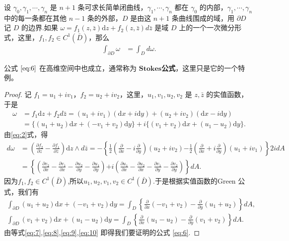 \documentclass[../../main.tex]{subfiles}
\begin{document}
\begin{theorem}[Green公式]\label{theorem:Green公式-复变函数形式}
设 \( \gamma_0, \gamma_1, \cdots, \gamma_n \) 是 \( n + 1 \) 条可求长简单闭曲线，\( \gamma_1, \cdots, \gamma_n \) 都在 \( \gamma_0 \) 的内部，\( \gamma_1, \cdots, \gamma_n \) 中的每一条都在其他 \( n - 1 \) 条的外部，\( D \) 是由这 \( n + 1 \) 条曲线围成的域，用 \(\partial D \) 记 \( D \) 的边界.如果 \( \omega = f_1(z,\bar{z})\mathrm{d}z + f_2(z,\bar{z})d\bar{z} \) 是域 \( D \) 上的一个一次微分形式，这里，\( f_1,f_2 \in C^1(\bar{D}) \)，那么
\begin{align}
\int_{\partial D} \omega &= \int_D d\omega. \label{eq:6}
\end{align}
\end{theorem}
\begin{note}
公式 \(\eqref{eq:6}\) 在高维空间中也成立，通常称为 $\mathbf{Stokes}$\textbf{公式}，这里只是它的一个特例。
\end{note}
\begin{proof}
记 \( f_1 = u_1 + iv_1 \)，\( f_2 = u_2 + iv_2 \)，这里，\( u_1,v_1,u_2,v_2 \) 是 \( z,\bar{z} \) 的实值函数，于是
\begin{align}\label{eq:7}
\omega &= f_1 \mathrm{d}z + f_2 d\bar{z} = (u_1 + iv_1)(\mathrm{d}x + i\mathrm{d}y) + (u_2 + iv_2)(\mathrm{d}x - i\mathrm{d}y) \nonumber \\
&= \{(u_1 + u_2)\mathrm{d}x + (-v_1 + v_2)\mathrm{d}y\}+ i\{(v_1 + v_2)\mathrm{d}x + (u_1 - u_2)\mathrm{d}y\}.
\end{align}
由\eqref{eq:2}式，得
\begin{align}
d\omega &= \left( \frac{\partial f_2}{\partial z} - \frac{\partial f_1}{\partial \bar{z}} \right) \mathrm{d}z \wedge d\bar{z} = -\left\{ \frac{1}{2} \left( \frac{\partial}{\partial x} - i \frac{\partial}{\partial y} \right)(u_2 + iv_2) \right. \left. - \frac{1}{2} \left( \frac{\partial}{\partial x} + i \frac{\partial}{\partial y} \right)(u_1 + iv_1) \right\} 2idA \nonumber \\
&= \left\{ \left( \frac{\partial v_2}{\partial x} - \frac{\partial v_1}{\partial x} - \frac{\partial u_2}{\partial y} - \frac{\partial u_1}{\partial y} \right) \right. \left. + i \left( \frac{\partial u_1}{\partial x} - \frac{\partial u_2}{\partial x} - \frac{\partial v_1}{\partial y} - \frac{\partial v_2}{\partial y} \right) \right\} dA. \label{eq:8}
\end{align}
因为\( f_1,f_2 \in C^1(\bar{D}) \),所以$u_1,u_2,v_1,v_2\in C^1(\bar{D})$.于是根据实值函数的Green 公式，我们有
\begin{gather}
\int_{\partial D} (u_1 + u_2)\mathrm{d}x + (-v_1 + v_2)\mathrm{d}y = \int_D \left\{ \frac{\partial}{\partial x}(-v_1 + v_2) - \frac{\partial}{\partial y}(u_1 + u_2) \right\} dA, \label{eq:9}
\\
\int_{\partial D} (v_1 + v_2)\mathrm{d}x + (u_1 - u_2)\mathrm{d}y = \int_D \left\{ \frac{\partial}{\partial x}(u_1 - u_2) - \frac{\partial}{\partial y}(v_1 + v_2) \right\} dA. \label{eq:10}
\end{gather}
由等式\eqref{eq:7},\eqref{eq:8},\eqref{eq:9},\eqref{eq:10} 即得我们要证明的公式 \eqref{eq:6}.
\end{proof}
\end{document}
